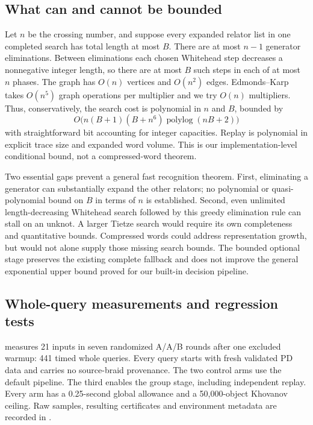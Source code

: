 \subsection{What can and cannot be bounded}

Let $n$ be the crossing number, and suppose every expanded relator list in
one completed search has total length at most $B$.  There are at most
$n-1$ generator eliminations.  Between eliminations each chosen Whitehead
step decreases a nonnegative integer length, so there are at most $B$
such steps in each of at most $n$ phases.  The graph has $O(n)$ vertices
and $O(n^2)$ edges.  Edmonds--Karp takes $O(n^5)$ graph operations per
multiplier and we try $O(n)$ multipliers.  Thus, conservatively, the search
cost is polynomial in $n$ and $B$, bounded by
\[
 O\bigl(n(B+1)(B+n^6)\operatorname{polylog}(nB+2)\bigr)
\]
with straightforward bit accounting for integer capacities.  Replay is
polynomial in explicit trace size and expanded word volume.  This is our
implementation-level conditional bound, not a compressed-word theorem.

Two essential gaps prevent a general fast recognition theorem.  First,
eliminating a generator can substantially expand the other relators; no
polynomial or quasi-polynomial bound on $B$ in terms of $n$ is established.
Second, even unlimited length-decreasing Whitehead search followed by this
greedy elimination rule can stall on an unknot.  A larger Tietze search
would require its own completeness and quantitative bounds.  Compressed
words could address representation growth, but would not alone supply
those missing search bounds.  The bounded optional stage preserves the
existing complete fallback and does not improve the general exponential
upper bound proved for our built-in decision pipeline.

\subsection{Whole-query measurements and regression tests}

 measures 21 inputs in seven randomized
A/A/B rounds after one excluded warmup: 441 timed whole queries.
Every query starts with fresh validated PD data and carries no source-braid
provenance.  The two control arms use the default pipeline.  The third
enables the group stage, including independent replay.  Every arm has a
0.25-second global allowance and a 50,000-object Khovanov ceiling.  Raw
samples, resulting certificates and environment metadata are recorded in
.

